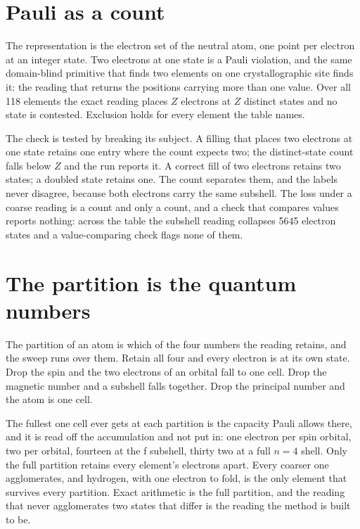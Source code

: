 \section{Pauli as a count}

The representation is the electron set of the neutral atom, one point per electron at an integer
state. Two electrons at one state is a Pauli violation, and the same domain-blind primitive that finds
two elements on one crystallographic site finds it: the reading that returns the positions carrying
more than one value. Over all 118 elements the exact reading places $Z$ electrons at $Z$ distinct
states and no state is contested. Exclusion holds for every element the table names.

The check is tested by breaking its subject. A filling that places two electrons at one state retains
one entry where the count expects two; the distinct-state count falls below $Z$ and the run reports
it. A correct fill of two electrons retains two states; a doubled state retains one. The count separates
them, and the labels never disagree, because both electrons carry the same subshell. The loss under a
coarse reading is a count and only a count, and a check that compares values reports nothing: across
the table the subshell reading collapses 5645 electron states and a value-comparing check flags none
of them.

\section{The partition is the quantum numbers}

The partition of an atom is which of the four numbers the reading retains, and the sweep runs over
them. Retain all four and every electron is at its own state. Drop the spin and the two electrons
of an orbital fall to one cell. Drop the magnetic number and a subshell falls together. Drop the
principal number and the atom is one cell.

The fullest one cell ever gets at each partition is the capacity Pauli allows there, and it is read
off the accumulation and not put in: one electron per spin orbital, two per orbital, fourteen at the
f subshell, thirty two at a full $n = 4$ shell. Only the full partition retains every element's
electrons apart. Every coarser one agglomerates, and hydrogen, with one electron to fold, is the only
element that survives every partition. Exact arithmetic is the full partition, and the reading that
never agglomerates two states that differ is the reading the method is built to be.
